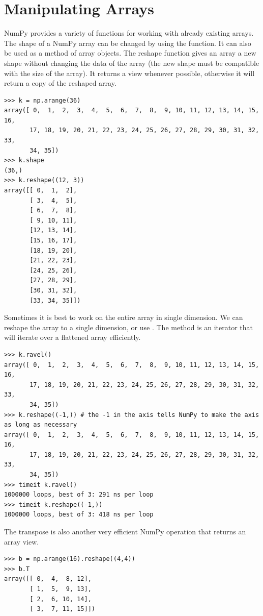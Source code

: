 \section*{Manipulating Arrays}
NumPy provides a variety of functions for working with already existing arrays.
The shape of a NumPy array can be changed by using the  function.
It can also be used as a method of array objects.
The reshape function gives an array a new shape without changing the data of the array (the new shape must be compatible with the size of the array).
It returns a view whenever possible, otherwise it will return a copy of the reshaped array.
\begin{lstlisting}
>>> k = np.arange(36)
array([ 0,  1,  2,  3,  4,  5,  6,  7,  8,  9, 10, 11, 12, 13, 14, 15, 16,
       17, 18, 19, 20, 21, 22, 23, 24, 25, 26, 27, 28, 29, 30, 31, 32, 33,
       34, 35])
>>> k.shape
(36,)
>>> k.reshape((12, 3))
array([[ 0,  1,  2],
       [ 3,  4,  5],
       [ 6,  7,  8],
       [ 9, 10, 11],
       [12, 13, 14],
       [15, 16, 17],
       [18, 19, 20],
       [21, 22, 23],
       [24, 25, 26],
       [27, 28, 29],
       [30, 31, 32],
       [33, 34, 35]])
\end{lstlisting}
Sometimes it is best to work on the entire array in single dimension.
We can reshape the array to a single dimension, or use .
The  method is an iterator that will iterate over a flattened array efficiently.
\begin{lstlisting}
>>> k.ravel()
array([ 0,  1,  2,  3,  4,  5,  6,  7,  8,  9, 10, 11, 12, 13, 14, 15, 16,
       17, 18, 19, 20, 21, 22, 23, 24, 25, 26, 27, 28, 29, 30, 31, 32, 33,
       34, 35])
>>> k.reshape((-1,)) # the -1 in the axis tells NumPy to make the axis as long as necessary
array([ 0,  1,  2,  3,  4,  5,  6,  7,  8,  9, 10, 11, 12, 13, 14, 15, 16,
       17, 18, 19, 20, 21, 22, 23, 24, 25, 26, 27, 28, 29, 30, 31, 32, 33,
       34, 35])
>>> timeit k.ravel()
1000000 loops, best of 3: 291 ns per loop
>>> timeit k.reshape((-1,))
1000000 loops, best of 3: 418 ns per loop
\end{lstlisting}
The transpose is also another very efficient NumPy operation that returns an array view.   
\begin{lstlisting}
>>> b = np.arange(16).reshape((4,4))
>>> b.T
array([[ 0,  4,  8, 12],
       [ 1,  5,  9, 13],
       [ 2,  6, 10, 14],
       [ 3,  7, 11, 15]])
\end{lstlisting}

